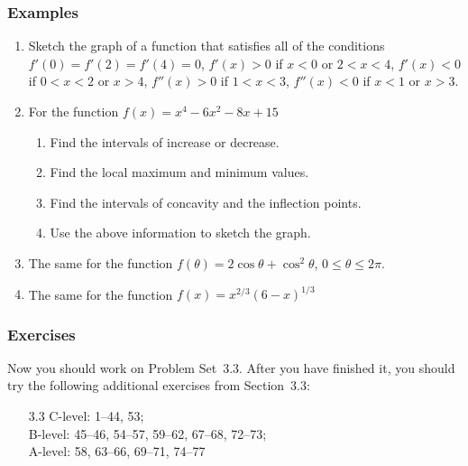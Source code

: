 \documentclass[serif,ignorenonframetext]{beamer}
\begin{document}
\begin{frame}
  \frametitle{Examples}
  \begin{enumerate}
  \item Sketch the graph of a function that satisfies all of the
    conditions $f'(0)=f'(2)=f'(4)=0$, $f'(x)>0$ if $x<0$ or $2<x<4$,
    $f'(x)<0$ if $0<x<2$ or $x>4$, $f''(x)>0$ if $1<x<3$,
    $f''(x)<0$ if $x<1$ or $x>3$.
  \item For the function $f(x)=x^4-6x^2-8x+15$
    \begin{enumerate}
    \item Find the intervals of increase or decrease.
    \item Find the local maximum and minimum values.
    \item Find the intervals of concavity and the inflection points.
    \item Use the above information to sketch the graph.
    \end{enumerate}
  \item The same for the function $f(\theta)=2\cos\theta+\cos^2\theta$,
    $0\le\theta\le 2\pi$.
  \item The same for the function $f(x)=x^{2/3}(6-x)^{1/3}$
  \end{enumerate} 
\end{frame}

\begin{frame}
  \frametitle{Exercises}
  Now you should work on Problem Set~3.3.  After you have finished it,
  you should try the following additional exercises from Section~3.3:
  \begin{itemize}
  \item[3.3] 
    C-level: 1--44, 53; \\
    B-level: 45--46, 54--57, 59--62, 67--68, 72--73; \\
    A-level: 58, 63--66, 69--71, 74--77
  \end{itemize}
\end{frame}
\end{document}
